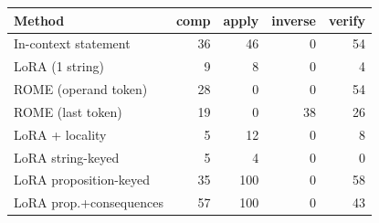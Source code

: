\begin{tabular}{lrrrr}
\toprule
Method & comp & apply & inverse & verify \\
\midrule
In-context statement & 36 & 46 & 0 & 54 \\
LoRA (1 string) & 9 & 8 & 0 & 4 \\
ROME (operand token) & 28 & 0 & 0 & 54 \\
ROME (last token) & 19 & 0 & 38 & 26 \\
LoRA + locality & 5 & 12 & 0 & 8 \\
LoRA string-keyed & 5 & 4 & 0 & 0 \\
LoRA proposition-keyed & 35 & 100 & 0 & 58 \\
LoRA prop.+consequences & 57 & 100 & 0 & 43 \\
\bottomrule
\end{tabular}
